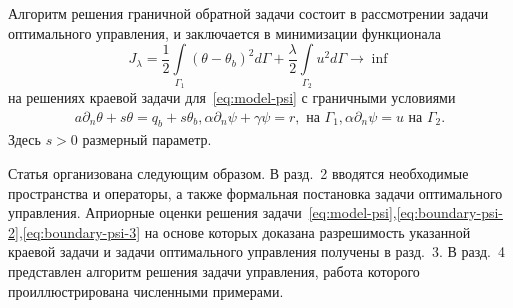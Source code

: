 Алгоритм решения граничной обратной задачи состоит в рассмотрении задачи оптимального управления,
и заключается в минимизации функционала
\begin{equation}
    \label{eq:quality}
    J_\lambda = \frac{1}{2}\int\limits_{\Gamma_1} (\theta - \theta_b)^2 d\Gamma
    + \frac{\lambda}{2} \int\limits_{\Gamma_2} u^2 d\Gamma \rightarrow \inf
\end{equation}
на решениях краевой задачи для~\eqref{eq:model-psi} с граничными условиями
\begin{equation}
    \label{eq:boundary-psi-3}
     \begin{aligned}
        a \partial_n \theta + s \theta = q_b + s\theta_b, \alpha \partial_n \psi + \gamma \psi = r, \text{ на } \Gamma_1,
        \alpha \partial_n \psi = u \text{ на } \Gamma_2.
    \end{aligned}
\end{equation}
Здесь $s > 0$ размерный параметр.


Статья организована следующим образом.
В разд.\ 2 вводятся необходимые пространства и операторы,
а также формальная постановка задачи оптимального управления.
Априорные оценки решения задачи~\eqref{eq:model-psi},\eqref{eq:boundary-psi-2},\eqref{eq:boundary-psi-3}
на основе которых доказана разрешимость
указанной краевой задачи и задачи оптимального управления получены в разд.\ 3.
В разд.\ 4 представлен алгоритм решения задачи управления, работа которого
проиллюстрирована численными примерами.


